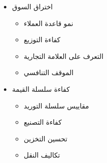 \begin{itemize}
\begin{itemize}
        \item اختراق السوق
        \begin{itemize}
            \item نمو قاعدة العملاء
            \item كفاءة التوزيع
            \item التعرف على العلامة التجارية
            \item الموقف التنافسي
        \end{itemize}
        
        \item كفاءة سلسلة القيمة
        \begin{itemize}
            \item مقاييس سلسلة التوريد
            \item كفاءة التصنيع
            \item تحسين التخزين
            \item تكاليف النقل
        \end{itemize}
    \end{itemize}
\end{itemize}

